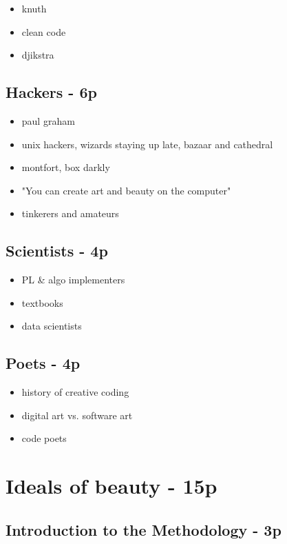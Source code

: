 \begin{itemize}
    \item knuth
    \item clean code
    \item djikstra
\end{itemize}

\subsection{Hackers - 6p}

\begin{itemize}
    \item paul graham
    \item unix hackers, wizards staying up late, bazaar and cathedral
    \item montfort, box darkly
    \item "You can create art and beauty on the computer"
    \item tinkerers and amateurs
\end{itemize}

\subsection{Scientists - 4p}

\begin{itemize}
    \item PL \& algo implementers
    \item textbooks
    \item data scientists
\end{itemize}

\subsection{Poets - 4p}

\begin{itemize}
    \item history of creative coding
    \item digital art vs. software art
    \item code poets
\end{itemize}


\section{Ideals of beauty - 15p}

\subsection{Introduction to the Methodology - 3p}


